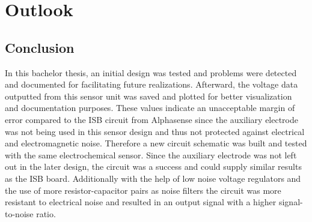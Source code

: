 \chapter{Outlook}
\label{sec:outlook}
\section{Conclusion}

In this bachelor thesis, an initial design was tested and problems were detected and documented for facilitating future realizations. Afterward, the voltage data outputted from this sensor unit was saved and plotted for better visualization and documentation purposes. These values indicate an unacceptable margin of error compared to the ISB circuit from Alphasense since the auxiliary electrode was not being used in this sensor design and thus not protected against electrical and electromagnetic noise. Therefore a new circuit schematic was built and tested with the same electrochemical sensor. Since the auxiliary electrode was not left out in the later design, the circuit was a success and could supply similar results as the ISB board. Additionally with the help of low noise voltage regulators and the use of more resistor-capacitor pairs as noise filters the circuit was more resistant to electrical noise and resulted in an output signal with a higher signal-to-noise ratio.\par 

